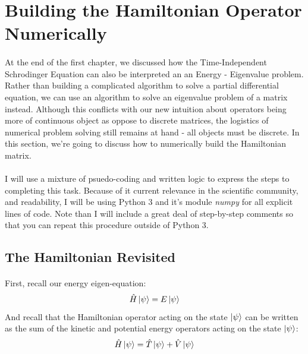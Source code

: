 \documentclass[12pt,letterpaper]{book}
\begin{document}


\section{Building the Hamiltonian Operator Numerically}
\paragraph*{}At the end of the first chapter, we discussed how the Time-Independent Schrodinger Equation can also be interpreted an an Energy - Eigenvalue problem. Rather than building a complicated algorithm to solve a partial differential equation, we can use an algorithm to solve an eigenvalue problem of a matrix instead. Although this conflicts with our new intuition about operators being more of continuous object as oppose to discrete matrices, the logistics of numerical problem solving still remains at hand - all objects must be discrete. In this section, we're going to discuss how to numerically build the Hamiltonian matrix.
\paragraph*{}I will use a mixture of psuedo-coding and written logic to express the steps to completing this task. Because of it current relevance in the scientific community, and readability, I will be using Python 3 and it's module \textit{numpy} for all explicit lines of code. Note than I will include a great deal of step-by-step comments so that you can repeat this procedure outside of Python 3.


\subsection*{The Hamiltonian Revisited}

\paragraph*{}First, recall our energy eigen-equation:
\begin{equation}
\label{energy-evp}
\hat{H}\ket{\psi} = E\ket{\psi}
\end{equation}
And recall that the Hamiltonian operator acting on the state $\ket{\psi}$ can be written as the sum of the kinetic and potential energy operators acting on the state $\ket{\psi}$:
\begin{equation}
\hat{H}\ket{\psi} = \hat{T}\ket{\psi} + \hat{V}\ket{\psi}
\end{equation}
\end{document}
